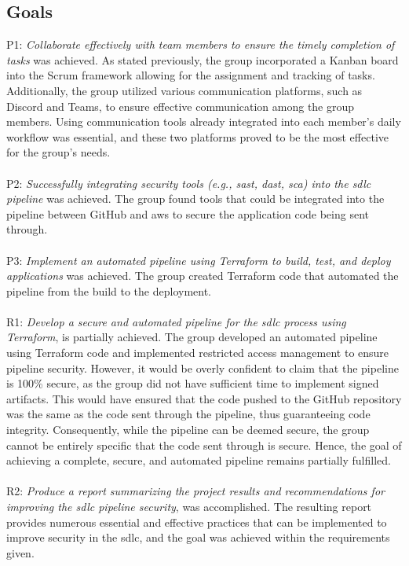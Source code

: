 \subsection{Goals}
P1: \textit{Collaborate effectively with team members to ensure the timely completion of tasks} was achieved. As stated previously, the group incorporated a Kanban board into the Scrum framework allowing for the assignment and tracking of tasks. Additionally, the group utilized various communication platforms, such as Discord and Teams, to ensure effective communication among the group members. Using communication tools already integrated into each member's daily workflow was essential, and these two platforms proved to be the most effective for the group's needs. 
\\~\\
P2: \textit{Successfully integrating security tools (e.g., \acrshort{sast}, \acrshort{dast}, \acrshort{sca}) into the \acrshort{sdlc} \gls{pipeline}} was achieved. The group found tools that could be integrated into the \gls{pipeline} between GitHub and \acrshort{aws} to secure the application code being sent through.
\\~\\
P3: \textit{Implement an automated \gls{pipeline} using Terraform to build, test, and deploy applications} was achieved. The group created Terraform code that automated the pipeline from the build to the deployment. 
\\~\\
R1: \textit{Develop a secure and automated \gls{pipeline} for the \acrshort{sdlc} process using Terraform}, is partially achieved. The group developed an automated pipeline using Terraform code and implemented restricted access management to ensure pipeline security. However, it would be overly confident to claim that the \gls{pipeline} is 100\% secure, as the group did not have sufficient time to implement signed artifacts. This would have ensured that the code pushed to the GitHub repository was the same as the code sent through the \gls{pipeline}, thus guaranteeing code integrity. Consequently, while the \gls{pipeline} can be deemed secure, the group cannot be entirely specific that the code sent through is secure. Hence, the goal of achieving a complete, secure, and automated \gls{pipeline} remains partially fulfilled. 
\\~\\
R2: \textit{Produce a report summarizing the project results and recommendations for improving the \acrshort{sdlc} \gls{pipeline} security}, was accomplished. The resulting report provides numerous essential and effective practices that can be implemented to improve security in the \acrshort{sdlc}, and the goal was achieved within the requirements given. 

